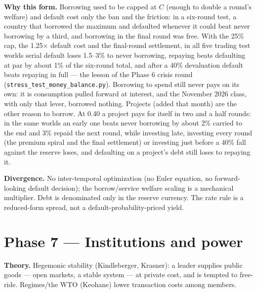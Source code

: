 \documentclass[11pt]{article}
\newcommand{\code}[1]{\texttt{#1}}
\begin{document}
\textbf{Why this form.} Borrowing used to be capped at $C$ (enough to double a
round's welfare) and default cost only the ban and the friction: in a six-round
test, a country that borrowed the maximum and defaulted whenever it could beat
never borrowing by a third, and borrowing in the final round was free. With the
25\% cap, the 1.25$\times$ default cost and the final-round settlement, in all five
trading test worlds serial default loses 1.5--3\% to never borrowing, repaying beats
defaulting at par by about 1\% of the six-round total, and after a 40\%
devaluation default beats repaying in full --- the lesson of the Phase 6 crisis round
(\code{stress\_test\_money\_balance.py}). Borrowing to spend still never pays on
its own: it is consumption pulled forward at interest, and the November 2026 class,
with only that lever, borrowed nothing. Projects (added that month) are the other
reason to borrow. At 0.40 a project pays for itself in two and a half rounds: in
the same worlds an early one beats never borrowing by about 2\% carried to the end
and 3\% repaid the next round, while investing late, investing every round (the
premium spiral and the final settlement) or investing just before a 40\% fall
against the reserve loses, and defaulting on a project's debt still loses to
repaying it.

\textbf{Divergence.} No inter-temporal optimization (no Euler equation, no
forward-looking default decision); the borrow/service welfare scaling is a
mechanical multiplier. Debt is denominated only in the reserve currency. The rate
rule is a reduced-form spread, not a default-probability-priced yield.

\section{Phase 7 --- Institutions and power}
\textbf{Theory.} Hegemonic stability (Kindleberger, Krasner): a leader supplies
public goods --- open markets, a stable system --- at private cost, and is tempted
to free-ride. Regimes/the WTO (Keohane) lower transaction costs among members.
\end{document}
